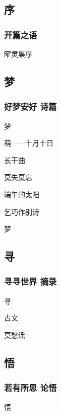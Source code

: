 \documentclass[letterpaper,10pt,english]{sphinxmanual}
\begin{document}
\subsection{序}
\label{\detokenize{poem/Preface::doc}}\label{\detokenize{poem/Preface:id1}}

\subsubsection{开篇之语}
\label{\detokenize{poem/Preface:id2}}
曜灵集序


\subsection{梦}
\label{\detokenize{poem/Chap1::doc}}\label{\detokenize{poem/Chap1:id3}}\label{\detokenize{poem/Chap1:id1}}

\subsubsection{好梦安好 诗篇}
\label{\detokenize{poem/Chap1:id2}}
梦

萌——十月十日

长干曲

莫失莫忘

端午的太阳

乞巧作别诗

梦


\subsection{寻}
\label{\detokenize{poem/Chap2:id1}}\label{\detokenize{poem/Chap2::doc}}\label{\detokenize{poem/Chap2:id9}}

\subsubsection{寻寻世界 摘录}
\label{\detokenize{poem/Chap2:id2}}
寻

古文

莫愁谣


\subsection{悟}
\label{\detokenize{poem/Chap3:id5}}\label{\detokenize{poem/Chap3::doc}}\label{\detokenize{poem/Chap3:id1}}

\subsubsection{若有所思 论悟}
\label{\detokenize{poem/Chap3:id2}}
悟
\end{document}
